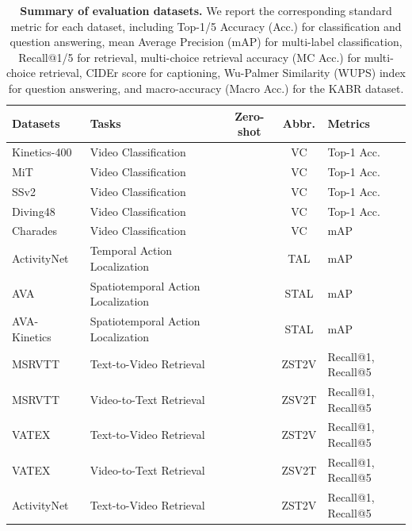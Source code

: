 \documentclass{article}
\theoremstyle{plain}
\theoremstyle{definition}
\theoremstyle{remark}
\newcommand{\tabrow}{\rowcolor{gray!10 }}
\newcommand{\cmark}{\ding{51}}
\newcommand{\xmark}{\ding{55}}
\begin{document}
\begin{table}
    \caption{
    \textbf{Summary of evaluation datasets.}
    We report the corresponding standard metric for each dataset, including Top-1/5 Accuracy (Acc.) for classification and question answering, mean Average Precision (mAP) for multi-label classification, Recall@1/5 for retrieval, multi-choice retrieval accuracy (MC Acc.) for multi-choice retrieval, CIDEr score for captioning, Wu-Palmer Similarity (WUPS) index for question answering, and macro-accuracy (Macro Acc.) for the KABR dataset.
    }
    \label{tab:eval_datasets}
    \begin{center}
    \begin{scriptsize}
\begin{tabular}{l|l|c|c|l}
    \toprule
    Datasets & Tasks & Zero-shot & Abbr. & Metrics \\
    \midrule
    \tabrow Kinetics-400~\cite{kay2017kinetics} & Video Classification & \xmark & VC & Top-1 Acc. \\
    MiT~\cite{monfort2019moments} & Video Classification & \xmark  & VC & Top-1 Acc. \\
    \tabrow SSv2~\cite{goyal2017something} & Video Classification & \xmark & VC & Top-1 Acc. \\
    Diving48~\cite{li2018resound} & Video Classification & \xmark & VC & Top-1 Acc. \\
    \tabrow Charades~\cite{sigurdsson2016hollywood} & Video Classification & \xmark & VC & mAP \\
    ActivityNet~\cite{caba2015activitynet} & Temporal Action Localization & \xmark & TAL & mAP \\
    \tabrow AVA~\cite{gu2018ava} & Spatiotemporal Action Localization & \xmark & STAL & mAP \\
    AVA-Kinetics~\cite{li2020ava} & Spatiotemporal Action Localization & \xmark & STAL & mAP \\
    \midrule
    \tabrow MSRVTT~\cite{xu2016msr} & Text-to-Video Retrieval & \cmark & ZST2V & Recall@1, Recall@5 \\
    MSRVTT~\cite{xu2016msr} & Video-to-Text Retrieval & \cmark & ZSV2T & Recall@1, Recall@5 \\
    \tabrow VATEX~\cite{wang2019vatex} & Text-to-Video Retrieval & \cmark & ZST2V & Recall@1, Recall@5 \\
    VATEX~\cite{wang2019vatex} & Video-to-Text Retrieval & \cmark & ZSV2T & Recall@1, Recall@5 \\
    \tabrow ActivityNet~\cite{caba2015activitynet} & Text-to-Video Retrieval & \cmark & ZST2V & Recall@1, Recall@5 \\

\end{tabular}
\end{scriptsize}
\end{center}
\end{table}
\end{document}
